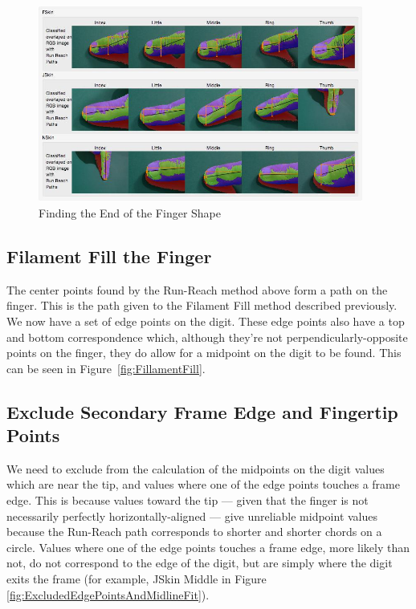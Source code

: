 \begin{figure}[h!]
  \centering
    \includegraphics[width=0.95\textwidth]{Chapter4/Figs/FindingTheTip.jpg}
    \caption{Finding the End of the Finger Shape}\label{fig:FindingTheTip}
\end{figure}



\subsection{Filament Fill the Finger}\label{sec:FilamentFillTheFinger}
The center points found by the Run-Reach method above form a path on the finger. This is the path given to the Filament Fill method described previously. We now have a set of edge points on the digit. These edge points also have a top and bottom correspondence which, although they're not perpendicularly-opposite points on the finger, they do allow for a midpoint on the digit to be found. This can be seen in Figure~\ref{fig:FillamentFill}.

\subsection{Exclude Secondary Frame Edge and Fingertip Points }\label{sec:ExcludeSecondaryFrameEdgePointsAndFingertipPoints}
We need to exclude from the calculation of the midpoints on the digit values which are near the tip, and values where one of the edge points touches a frame edge. This is because values toward the tip --- given that the finger is not necessarily perfectly horizontally-aligned --- give unreliable midpoint values because the Run-Reach path corresponds to shorter and shorter chords on a circle. Values where one of the edge points touches a frame edge, more likely than not, do not correspond to the edge of the digit, but are simply where the digit exits the frame (for example, JSkin Middle in Figure \ref{fig:ExcludedEdgePointsAndMidlineFit}).

